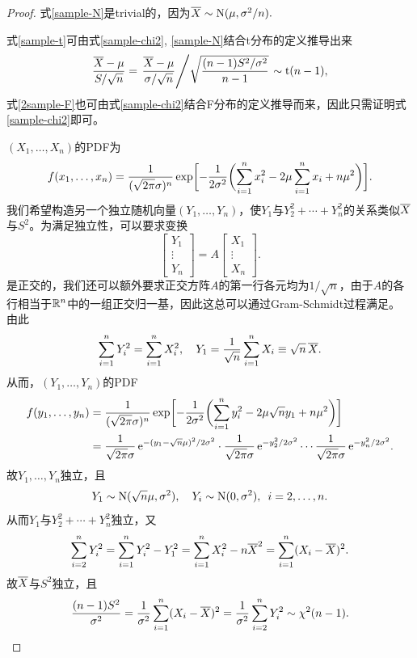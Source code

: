 \begin{proof}
	式\eqref{sample-N}是trivial的，因为$\overline{X}\sim\operatorname{N}(\mu,\sigma^2/n).$
	
	式\eqref{sample-t}可由式\eqref{sample-chi2}, \eqref{sample-N}结合t分布的定义推导出来
	\[
		\frac{\overline{X}-\mu}{S/\sqrt n}=\left.{\frac{\overline{X}-\mu}{\sigma/\sqrt n}}\middle/{\sqrt{\frac{(n-1)S^2/\sigma^2}{n-1}}}\right.\sim\mathrm t(n-1),
	\]
	式\eqref{2sample-F}也可由式\eqref{sample-chi2}结合F分布的定义推导而来，因此只需证明式\eqref{sample-chi2}即可。

	$(X_1,\ldots,X_n)$的PDF为
	\[
		f(x_1,\ldots,x_n)=\frac1{(\sqrt{2\pi}\sigma)^n}\exp\biggl[-\frac1{2\sigma^2}\biggl(\sum_{i=1}^nx_i^2-2\mu\sum_{i=1}^nx_i+n\mu^2\biggr)\biggr].
	\]
	我们希望构造另一个独立随机向量$(Y_1,\ldots,Y_n)$，使$Y_1$与$Y_2^2+\cdots+Y_n^2$的关系类似$\overline{X}$与$S^2$。为满足独立性，可以要求变换
	\[
		\begin{bmatrix}
			Y_1\\\vdots\\Y_n
		\end{bmatrix}=A\begin{bmatrix}
			X_1\\\vdots\\X_n
		\end{bmatrix}.
	\]
	是正交的，我们还可以额外要求正交方阵$A$的第一行各元均为$1/\sqrt n$，由于$A$的各行相当于$\mathbb R^n$中的一组正交归一基，因此这总可以通过Gram-Schmidt过程满足。
	由此
	\[
		\sum_{i=1}^nY_i^2=\sum_{i=1}^nX_i^2,\quad Y_1=\frac1{\sqrt n}\sum_{i=1}^nX_i\equiv\sqrt n\,\overline{X}.
	\]
	从而，$(Y_1,\ldots,Y_n)$的PDF
	\begin{align*}
		f(y_1,\ldots,y_n)&=\frac1{(\sqrt{2\pi}\sigma)^n}\exp\biggl[-\frac1{2\sigma^2}\biggl(\sum_{i=1}^ny_i^2-2\mu\sqrt ny_1+n\mu^2\biggr)\biggr]\\
		&=\frac1{\sqrt{2\pi}\sigma}\mathop{}\!\mathrm{e}^{-(y_1-\sqrt n\mu)^2/2\sigma^2}\cdot\frac1{\sqrt{2\pi}\sigma}\mathop{}\!\mathrm{e}^{-y_2^2/2\sigma^2}\cdots\frac1{\sqrt{2\pi}\sigma}\mathop{}\!\mathrm{e}^{-y_n^2/2\sigma^2}.
	\end{align*}
	故$Y_1,\ldots,Y_n$独立，且
	\[
		Y_1\sim\operatorname{N}(\sqrt n\mu,\sigma^2),\quad Y_i\sim\operatorname{N}(0,\sigma^2),\enspace i=2,\ldots,n.
	\]
	从而$Y_1$与$Y_2^2+\cdots+Y_n^2$独立，又
	\[
		\sum_{i=2}^nY_i^2=\sum_{i=1}^nY_i^2-Y_1^2=\sum_{i=1}^nX_i^2-n\overline{X}^2=\sum_{i=1}^n(X_i-\overline{X})^2.
	\]
	故$\overline{X}$与$S^2$独立，且
	\[
		\frac{(n-1)S^2}{\sigma^2}=\frac1{\sigma^2}\sum_{i=1}^n(X_i-\overline{X})^2=\frac1{\sigma^2}\sum_{i=2}^nY_i^2\sim\chi^2(n-1).
		\qedhere
	\]
\end{proof}